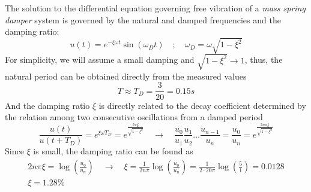 The solution to the differential equation governing free vibration of a \emph{mass spring damper} system is governed by the natural and damped frequencies and the damping ratio:
$$
u(t) = e^{-\xi\omega t}\sin(\omega_D t) \quad ; \quad \omega_D = \omega\sqrt{1-\xi^2}
$$
For simplicity, we will assume a small damping and $\sqrt{1-\xi^2}\rightarrow1$, thus, the natural period can be obtained directly from the measured values
$$
T \approx T_D = \frac{3}{20} = 0.15s
$$
And the damping ratio $\xi$ is directly related to the decay coefficient determined by the relation among two consecutive oscillations from a damped period
$$
\frac{u(t)}{u(t+T_D)} = e^{\xi\omega T_D} = e^{\frac{2\pi\xi}{\sqrt{1-\xi^2}}} \quad \rightarrow \quad
\frac{u_0}{u_1} \frac{u_1}{u_2} \dots \frac{u_{n-1}}{u_n} = \frac{u_0}{u_n} = e^{\frac{2n\pi\xi}{\sqrt{1-\xi^2}}}
$$
Since $\xi$ is small, the damping ratio can be found as
\begin{align*}
2n\pi\xi = \log\left(\frac{u_0}{u_n}\right) \quad \rightarrow \quad
\xi = \frac{1}{2n\pi} \log\left(\frac{u_0}{u_n}\right) = \frac{1}{2\cdot20\pi} \log\left(\frac{5}{1}\right) = 0.0128 \\
\xi = 1.28\%
\end{align*}
